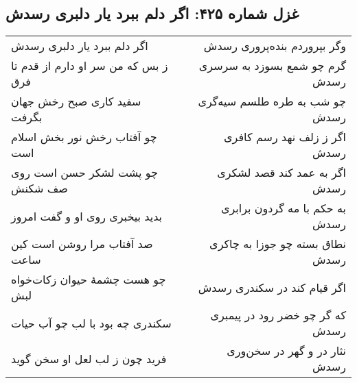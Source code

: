 \begin{center}
\section*{غزل شماره ۴۲۵: اگر دلم ببرد یار دلبری رسدش}
\label{sec:425}
\begin{longtable}{l p{0.5cm} r}
اگر دلم ببرد یار دلبری رسدش
&&
وگر بپروردم بنده‌پروری رسدش
\\
ز بس که من سر او دارم از قدم تا فرق
&&
گرم چو شمع بسوزد به سرسری رسدش
\\
سفید کاری صبح رخش جهان بگرفت
&&
چو شب به طره طلسم سیه‌گری رسدش
\\
چو آفتاب رخش نور بخش اسلام است
&&
اگر ز زلف نهد رسم کافری رسدش
\\
چو پشت لشکر حسن است روی صف شکنش
&&
اگر به عمد کند قصد لشکری رسدش
\\
بدید بیخبری روی او و گفت امروز
&&
به حکم با مه گردون برابری رسدش
\\
صد آفتاب مرا روشن است کین ساعت
&&
نطاق بسته چو جوزا به چاکری رسدش
\\
چو هست چشمهٔ حیوان زکات‌خواه لبش
&&
اگر قیام کند در سکندری رسدش
\\
سکندری چه بود با لب چو آب حیات
&&
که گر چو خضر رود در پیمبری رسدش
\\
فرید چون ز لب لعل او سخن گوید
&&
نثار در و گهر در سخن‌وری رسدش
\\
\end{longtable}
\end{center}
